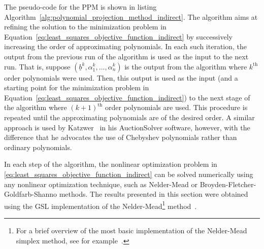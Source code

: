 The pseudo-code for the PPM is shown in listing Algorithm~\ref{alg:polynomial_projection_method_indirect}. The algorithm aims at refining the solution to the minimization problem in Equation~\eqref{eq:least_squares_objective_function_indirect} by successively increasing the order of approximating polynomials. In each such iteration, the output from the previous run of the algorithm is used as the input to the next run. That is, suppose $(\underline{b}^k, \alpha_1^k, \dotsc, \alpha_n^k)$ is the output from the algorithm where $k^\text{th}$ order polynomials were used. Then, this output is used as the input (and a starting point for the minimization problem in Equation~\eqref{eq:least_squares_objective_function_indirect}) to the next stage of the algorithm where $(k+1)^\text{th}$ order polynomials are used. This procedure is repeated until the approximating polynomials are of the desired order. A similar approach is used by Katzwer~\cite{Katzwer2012} in his AuctionSolver software, however, with the difference that he advocates the use of Chebyshev polynomials rather than ordinary polynomials.

In each step of the algorithm, the nonlinear optimization problem in \eqref{eq:least_squares_objective_function_indirect} can be solved numerically using any nonlinear optimization technique, such as Nelder-Mead or Broyden-Fletcher-Goldfarb-Shanno methods. The results presented in this section were obtained using the GSL implementation of the Nelder-Mead\footnote{For a brief overview of the most basic implementation of the Nelder-Mead simplex method, see for example~\cite{KonkaNMSimplex2013}.} method~\cite{GSL}.

